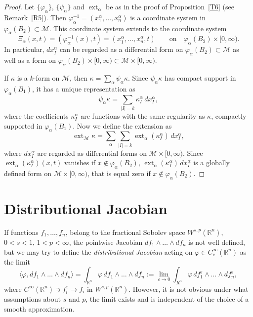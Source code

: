 \documentclass[intlimits,12pt,reqno]{amsart}
\newcommand{\cM}{\mathcal M}
\newcommand{\R}{\mathbb R}
\newcommand{\eps}{\varepsilon}
\numberwithin{equation}{section}
\def\ext{\operatorname{ext}}
\theoremstyle{definition}
\begin{document}
\begin{proof}
Let $\{\varphi_\alpha\}$, $\{\psi_\alpha\}$ and $\ext_\alpha$
be as in the proof of Proposition~\ref{T6} (see Remark~\ref{R5}). Then 
$\varphi_\alpha^{-1}=(x_1^\alpha,\ldots,x_n^\alpha)$ is a coordinate system in $\varphi_\alpha(B_2)\subset\cM$. This coordinate system extends to the coordinate system 
$$ 
\Xi_\alpha(x,t)=(\varphi_\alpha^{-1}(x),t)=(x_1^\alpha,\ldots,x_n^\alpha,t)
\qquad
\text{on} 
\quad 
\varphi_\alpha(B_2)\times [0,\infty). 
$$
In particular, $dx_I^\alpha$ can be regarded as a differential form on $\varphi_\alpha(B_2)\subset\cM$ as well as a form on  $\varphi_\alpha(B_2)\times [0,\infty)\subset\cM\times [0,\infty)$.

If $\kappa$ is a $k$-form on $\cM$, then
$\kappa=\sum_{\alpha}\psi_\alpha\kappa$. Since $\psi_\alpha\kappa$ has compact support in $\varphi_\alpha(B_1)$, it has a unique representation as
$$
\psi_\alpha\kappa = \sum_{|I|=k} \kappa_I^\alpha\, dx_I^\alpha,
$$
where the coefficients $\kappa_I^\alpha$ are functions with the same regularity as $\kappa$, compactly supported in  $\varphi_\alpha(B_1)$. Now we define the extension as
$$
\ext_{\cM}\kappa=\sum_{\alpha}\sum_{|I|=k}\ext_\alpha(\kappa_I^\alpha)\, dx_I^\alpha,
$$
where $dx_I^\alpha$ are regarded as differential forms on $\cM\times [0,\infty)$.
Since $\ext_\alpha(\kappa_I^\alpha)(x,t)$ vanishes if $x\not\in \varphi_\alpha(B_2)$,
$\ext_\alpha(\kappa_I^\alpha)\, dx_I^\alpha$ is a globally defined form  on $\cM\times [0,\infty)$, that is equal zero if $x\not\in\varphi_\alpha(B_2)$.
\end{proof}

\section{Distributional Jacobian}
\label{DJ}
If functions $f_1,\ldots,f_n$, belong to the fractional Sobolev space $W^{s,p}(\R^n)$, $0<s<1$, $1<p<\infty$, the pointwise Jacobian $df_1\wedge\ldots \wedge df_n$ is not well defined, but we may try to define the {\em distributional Jacobian} acting on $\varphi\in C_c^\infty(\R^n)$ as the limit
$$
\langle\varphi,df_1\wedge\ldots\wedge df_n\rangle=
\int_{\R^n}\varphi\, df_1\wedge\ldots\wedge df_n:=
\lim_{\eps\to 0} \int_{R^n}\varphi\, df_1^\eps\wedge\ldots\wedge df_n^\eps,
$$
where $C^\infty(\R^n)\ni f_i^\eps\to f_i$ in $W^{s,p}(\R^n)$. 
However, it is not obvious under what assumptions about $s$ and $p$, the limit exists and is independent of the choice of a smooth approximation.
\end{document}
